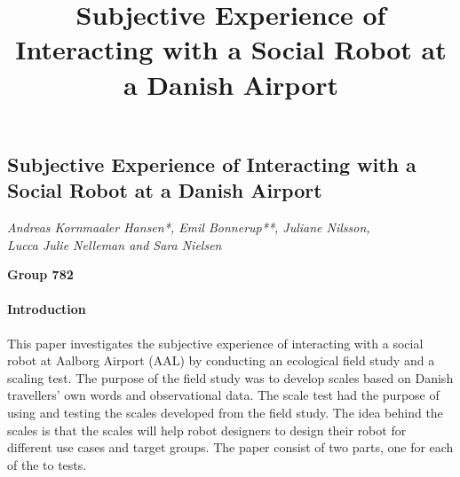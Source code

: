 \documentclass[a4paper]{article}
\title{Subjective Experience of Interacting with a Social Robot at a Danish Airport}
\begin{document}
{\centering 
\subsection*{Subjective Experience of Interacting with a Social Robot at a Danish Airport}}

{\centering
\textit{Andreas Kornmaaler Hansen*, Emil Bonnerup**, Juliane Nilsson, \\
Lucca Julie Nelleman and Sara Nielsen}
\par}

{\centering
\textbf{Group 782}
\par}


\bigskip

\paragraph{Introduction}
This paper investigates the subjective experience of interacting with a social robot at Aalborg Airport (AAL) by conducting an ecological field study and a scaling test. The purpose of the field study was to develop scales based on Danish travellers' own words and observational data. The scale test had the purpose of using and testing the scales developed from the field study. The idea behind the scales is that the scales will help robot designers to design their robot for different use cases and target groups. The paper consist of two parts, one for each of the to tests. 
\end{document}
